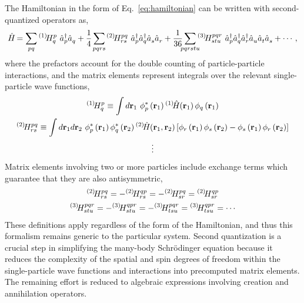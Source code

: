 \documentclass[thesis.tex]{subfiles}
\begin{document}
The Hamiltonian in the form of Eq.\ \eqref{eq:hamiltonian} can be written with second-quantized operators as,
\begin{equation}
  \Ham = \sum_{\mathclap{pq}}\Hint{1}{p}{q}\ \co{p}\ao{q} + \frac{1}{4}\sum_{\mathclap{pqrs}}\Hint{2}{pq}{rs}\ \co{p}\co{q}\ao{s}\ao{r} + \frac{1}{36}\sum_{\mathclap{pqrstu}}\Hint{3}{pqr}{stu}\ \co{p}\co{q}\co{r}\ao{u}\ao{t}\ao{s} + \cdots,
\end{equation}
where the prefactors account for the double counting of particle-particle interactions, and the matrix elements represent integrals over the relevant single-particle wave functions,
\begin{gather}
    {}^{\left(1\right)}\hspace{-2pt}H^{p}_{q} \equiv \int d\mathbf{r}_{1}\  \phi^{*}_{p}\left(\mathbf{r}_{1}\right) {}^{\left(1\right)}\hspace{-2pt}\hat{H}\hspace{-2pt}\left(\mathbf{r}_{1}\right) \phi_{q}\left(\mathbf{r}_{1}\right) \notag \\
    {}^{\left(2\right)}\hspace{-2pt}H^{pq}_{rs} \equiv \int d\mathbf{r}_{1} d\mathbf{r}_{2}\  \phi^{*}_{p}\left(\mathbf{r}_{1}\right)\phi^{*}_{q}\left(\mathbf{r}_{2}\right) {}^{\left(2\right)}\hspace{-2pt}\hat{H}\hspace{-2pt}\left(\mathbf{r}_{1},\mathbf{r}_{2}\right) \left[\phi_{r}\left(\mathbf{r}_{1}\right)\phi_{s}\left(\mathbf{r}_{2}\right) - \phi_{s}\left(\mathbf{r}_{1}\right)\phi_{r}\left(\mathbf{r}_{2}\right)\right] \notag \\
    \vdots
\end{gather}
Matrix elements involving two or more particles include exchange terms which guarantee that they are also antisymmetric,
\begin{gather} \label{eq:anti_sym_ME}
  {}^{\left(2\right)}\hspace{-2pt}H^{pq}_{rs} = -{}^{\left(2\right)}\hspace{-2pt}H^{qp}_{rs} = -{}^{\left(2\right)}\hspace{-2pt}H^{pq}_{sr} = {}^{\left(2\right)}\hspace{-2pt}H^{qp}_{sr} \notag \\
  {}^{\left(3\right)}\hspace{-2pt}H^{pqr}_{stu} = -{}^{\left(3\right)}\hspace{-2pt}H^{qpr}_{stu} = -{}^{\left(3\right)}\hspace{-2pt}H^{pqr}_{tsu} = {}^{\left(3\right)}\hspace{-2pt}H^{qpr}_{tsu} = \cdots
\end{gather}
These definitions apply regardless of the form of the Hamiltonian, and thus this formalism remains generic to the particular system.  Second quantization is a crucial step in simplifying the many-body Schr\"{o}dinger equation because it reduces the complexity of the spatial and spin degrees of freedom within the single-particle wave functions and interactions into precomputed matrix elements.  The remaining effort is reduced to algebraic expressions involving creation and annihilation operators.
\end{document}
